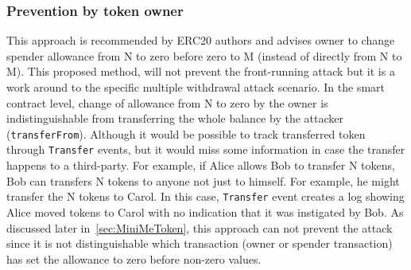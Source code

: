 \subsubsection*{Prevention by token owner} This approach is recommended by ERC20 authors \cite{Ref08} and advises owner to change spender allowance from N to zero before zero to M (instead of directly from N to M). This proposed method, will not prevent the front-running attack but it is a work around to the specific multiple withdrawal attack scenario. In the smart contract level, change of allowance from N to zero by the owner is indistinguishable from transferring the whole balance by the attacker (\texttt{transferFrom}).
\newline Although it would be possible to track transferred token through \texttt{Transfer} events, but it would miss some information in case the transfer happens to a third-party. For example, if Alice allows Bob to transfer N tokens, Bob can transfers N tokens to anyone not just to himself. For example, he might transfer the N tokens to Carol. In this case, \texttt{Transfer} event creates a log showing Alice moved tokens to Carol with no indication that it was instigated by Bob. As discussed later in~\ref{sec:MiniMeToken}, this approach can not prevent the attack since it is not distinguishable which transaction (\ie owner or spender transaction) has set the allowance to zero before non-zero values.

	
